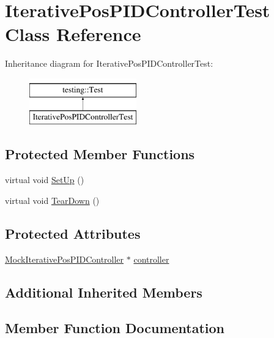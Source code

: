 \hypertarget{classIterativePosPIDControllerTest}{}\section{Iterative\+Pos\+P\+I\+D\+Controller\+Test Class Reference}
\label{classIterativePosPIDControllerTest}
Inheritance diagram for Iterative\+Pos\+P\+I\+D\+Controller\+Test\+:\begin{figure}[H]
\begin{center}
\leavevmode
\includegraphics[height=2.000000cm]{classIterativePosPIDControllerTest}
\end{center}
\end{figure}
\subsection*{Protected Member Functions}
\begin{DoxyCompactItemize}
\item 
virtual void \mbox{\hyperlink{classIterativePosPIDControllerTest_ab5f1ca4642181733ba311d32c1569a04}{Set\+Up}} ()
\item 
virtual void \mbox{\hyperlink{classIterativePosPIDControllerTest_aaf5bef722d91ba9f7af5744f2eb3b67e}{Tear\+Down}} ()
\end{DoxyCompactItemize}
\subsection*{Protected Attributes}
\begin{DoxyCompactItemize}
\item 
\mbox{\hyperlink{classMockIterativePosPIDController}{Mock\+Iterative\+Pos\+P\+I\+D\+Controller}} $\ast$ \mbox{\hyperlink{classIterativePosPIDControllerTest_ae8293d36aa235bdc4b8e10eee8fad86d}{controller}}
\end{DoxyCompactItemize}
\subsection*{Additional Inherited Members}


\subsection{Member Function Documentation}
\mbox{\label{classIterativePosPIDControllerTest_ab5f1ca4642181733ba311d32c1569a04}} 
